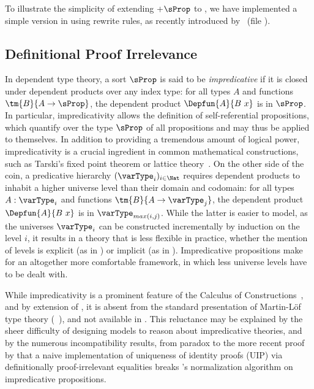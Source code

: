 To illustrate the simplicity of extending \MLTT+$\sProp$ to \SetoidTT,
we have implemented a simple version in
\Agda using rewrite rules, as recently introduced
by~ (file ). 


\subsection{Definitional Proof Irrelevance}

In dependent type theory, a sort \( \sProp \) is said to be
\emph{impredicative} if it is closed under dependent products over any index
type: for all types \( A \) and functions \( \tm{B}{A \to \sProp} \),
the dependent product \( \Depfun{A}{B\ x} \) is in \( \sProp \).
%
In particular, impredicativity allows the definition of self-referential propositions,
which quantify over the type \( \sProp \) of all propositions and may thus
be applied to themselves.
%
In addition to providing a tremendous amount of logical power, impredicativity is
a crucial ingredient in common mathematical constructions, such as
Tarski's fixed point theorem or lattice theory~.
%
On the other side of the coin, a predicative hierarchy $(\varType_i)_{i \in \Nat}$
requires dependent products to inhabit a higher universe level
than their domain and codomain: for all types \( A : \varType_i \) and functions
\( \tm{B}{A \to \varType_j} \), the dependent product
\( \Depfun{A}{B\ x} \) is in \( \varType_{max(i,j)} \).
%
While the latter is easier to model, as the universes $\varType_i$ can be
constructed incrementally by induction on the level $i$, it results
in a theory that is less flexible in practice, whether the mention of
levels is explicit (as in \Agda) or implicit (as in \Coq).
%
Impredicative propositions make for an altogether
more comfortable framework, in which less universe levels have to
be dealt with.

While impredicativity is a prominent feature of the Calculus of
Constructions~, and by extension of \Coq, it is
absent from the standard presentation of Martin-Löf type theory
(\MLTT~), and not available in \Agda.
%
This reluctance may be explained by the sheer difficulty of designing models
to reason about impredicative theories, and by the numerous incompatibility
results, from  paradox to the more recent proof by
 that a naive implementation of uniqueness of identity
proofs (UIP) via definitionally proof-irrelevant equalities breaks \Coq's
normalization algorithm on impredicative propositions.


